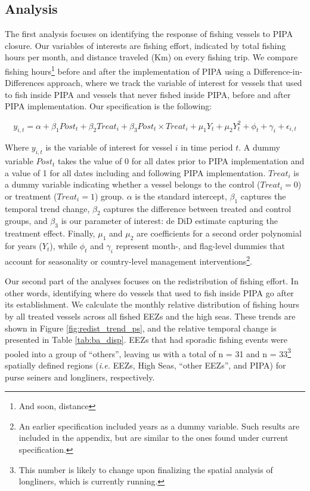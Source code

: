 \documentclass[12pt,]{article}
\let\rmarkdownfootnote\footnote%
\def\footnote{\protect\rmarkdownfootnote}
\begin{document}
\clearpage

\hypertarget{analysis}{%
\subsection{Analysis}\label{analysis}}

The first analysis focuses on identifying the response of fishing
vessels to PIPA closure. Our variables of interests are fishing effort,
indicated by total fishing hours per month, and distance traveled (Km)
on every fishing trip. We compare fishing hours\footnote{And soon,
  distance} before and after the implementation of PIPA using a
Difference-in-Differences approach, where we track the variable of
interest for vessels that used to fish inside PIPA and vessels that
never fished inside PIPA, before and after PIPA implementation. Our
specification is the following:

\[
y_{i,t} = \alpha + \beta_1 Post_t + \beta_2 Treat_i + \beta_3 Post_t \times Treat_i + \mu_1Y_t + \mu_2Y_t^2 + \phi_t + \gamma_i + \epsilon_{i,t}
\]

Where \(y_{i,t}\) is the variable of interest for vessel \(i\) in time
period \(t\). A dummy variable \(Post_t\) takes the value of 0 for all
dates prior to PIPA implementation and a value of 1 for all dates
including and following PIPA implementation. \(Treat_i\) is a dummy
variable indicating whether a vessel belongs to the control
(\(Treat_i = 0\)) or treatment (\(Treat_i = 1\)) group. \(\alpha\) is
the standard intercept, \(\beta_1\) captures the temporal trend change,
\(\beta_2\) captures the difference between treated and control groups,
and \(\beta_3\) is our parameter of interest: de DiD estimate capturing
the treatment effect. Finally, \(\mu_1\) and \(\mu_2\) are coefficients
for a second order polynomial for years (\(Y_t\)), while \(\phi_t\) and
\(\gamma_i\) represent month-, and flag-level dummies that account for
seasonality or country-level management interventions\footnote{An
  earlier specification included years as a dummy variable. Such results
  are included in the appendix, but are similar to the ones found under
  current specification.}.

Our second part of the analyses focuses on the redistribution of fishing
effort. In other words, identifying where do vessels that used to fish
inside PIPA go after its establishment. We calculate the monthly
relative distribution of fishing hours by all treated vessels across all
fished EEZs and the high seas. These trends are shown in Figure
\ref{fig:redist_trend_ps}, and the relative temporal change is presented
in Table \ref{tab:ba_disp}. EEZs that had sporadic fishing events were
pooled into a group of ``others'', leaving us with a total of n = 31 and
n = 33\footnote{This number is likely to change upon finalizing the
  spatial analysis of longliners, which is currently running.} spatially
defined regions (\emph{i.e.} EEZs, High Seas, ``other EEZs'', and PIPA)
for purse seiners and longliners, respectively.
\end{document}
